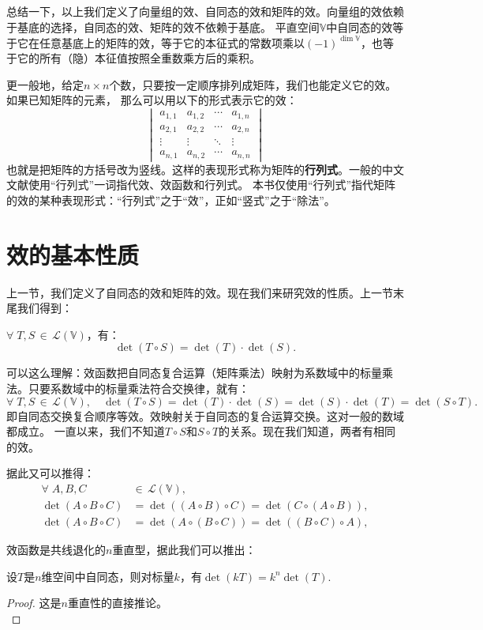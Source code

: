 \documentclass[12pt,UTF8]{ctexbook}
\begin{document}
总结一下，以上我们定义了向量组的效、自同态的效和矩阵的效。向量组的效依赖于基底的选择，自同态的效、矩阵的效不依赖于基底。
平直空间$\mathbb{V}$中自同态的效等于它在任意基底上的矩阵的效，等于它的本征式的常数项乘以$(-1)^{\dim \mathbb{V}}$，也等于它的所有（隐）本征值按照全重数乘方后的乘积。

更一般地，给定$n\times n$个数，只要按一定顺序排列成矩阵，我们也能定义它的效。如果已知矩阵的元素，
那么可以用以下的形式表示它的效：
$$ \begin{vmatrix}
    a_{1,1} & a_{1,2}  & \cdots & a_{1,n} \\
    a_{2,1} & a_{2,2} &  \cdots & a_{2,n} \\
    \vdots & \vdots & \ddots & \vdots \\
    a_{n,1} & a_{n,2} & \cdots & a_{n,n} 
\end{vmatrix}$$
也就是把矩阵的方括号改为竖线。这样的表现形式称为矩阵的\textbf{行列式}。一般的中文文献使用“行列式”一词指代效、效函数和行列式。
本书仅使用“行列式”指代矩阵的效的某种表现形式：“行列式”之于“效”，正如“竖式”之于“除法”。

\section{效的基本性质}
上一节，我们定义了自同态的效和矩阵的效。现在我们来研究效的性质。上一节末尾我们得到：
\begin{pp}
    $\forall \;T,S\,\in\,\mathcal{L}(\mathbb{V})$，有：
    $$ \det (T\circ S) = \det(T) \cdot \det(S). $$
\end{pp}
可以这么理解：效函数把自同态复合运算（矩阵乘法）映射为系数域中的标量乘法。只要系数域中的标量乘法符合交换律，就有：
$$
\forall \;T,S\,\in\,\mathcal{L}(\mathbb{V}), \quad \det (T\circ S) = \det(T) \cdot \det(S) = \det(S) \cdot \det(T) = \det(S\circ T).
$$
即自同态交换复合顺序等效。效映射关于自同态的复合运算交换。这对一般的数域都成立。
一直以来，我们不知道$T\circ S$和$S\circ T$的关系。现在我们知道，两者有相同的效。

据此又可以推得：
\begin{align*}
\forall \;A,B,C\,&\in\,\mathcal{L}(\mathbb{V}), \\
 \det (A\circ B\circ C) &= \det ((A\circ B)\circ C) = \det(C\circ(A\circ B)), \\
 \det (A\circ B\circ C) &= \det (A\circ (B\circ C)) = \det((B\circ C)\circ A),
\end{align*}

效函数是共线退化的$n$重直型，据此我们可以推出：
\begin{pp}\label{pp:10_30}
    设$T$是$n$维空间中自同态，则对标量$k$，有$\det(kT) = k^n \det(T)$.
\end{pp}
\begin{proof} %
    这是$n$重直性的直接推论。\\
\end{proof}
\end{document}
